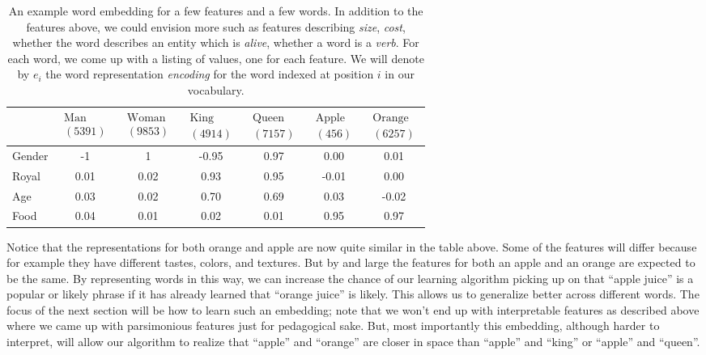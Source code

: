 \documentclass[12pt]{article}
\begin{document}
\begin{table}[h]
  \centering
  \begin{tabular}{l | c c c c c c }
    & $\substack{\textrm{Man} \\ (5391)}$ & $\substack{\textrm{Woman} \\ (9853)}$ & $\substack{\textrm{King} \\ (4914)}$ & $\substack{\textrm{Queen} \\ (7157)}$ & $\substack{\textrm{Apple} \\ (456)}$ & $\substack{\textrm{Orange} \\ (6257)}$ \\
\hline
Gender & -1 & 1 & -0.95 & 0.97 & 0.00 & 0.01 \\
Royal  & 0.01 & 0.02 & 0.93 & 0.95 & -0.01 & 0.00 \\
Age    & 0.03 & 0.02 & 0.70 & 0.69 & 0.03  & -0.02 \\
Food   & 0.04 & 0.01 & 0.02 & 0.01 & 0.95  & 0.97
  \end{tabular}
  \label{tb: wordembeddingtable}
\caption{\footnotesize An example word embedding for a few features and a few words. In addition to the features above, we could envision more such as features describing \emph{size}, \emph{cost}, whether the word describes an entity which is \emph{alive}, whether a word is a \emph{verb}. For each word, we come up with a listing of values, one for each feature. We will denote by $e_i$ the word representation \emph{encoding} for the word indexed at position $i$ in our vocabulary.}
\end{table}
Notice that the representations for both orange and apple are now quite similar in the table above. Some of the features will differ because for example they have different tastes, colors, and textures. But by and large the features for both an apple and an orange are expected to be the same. By representing words in this way, we can increase the chance of our learning algorithm picking up on that ``apple juice'' is a popular or likely phrase if it has already learned that ``orange juice'' is likely. This allows us to generalize better across different words. The focus of the next section will be how to learn such an embedding; note that we won't end up with interpretable features as described above where we came up with parsimonious features just for pedagogical sake. But, most importantly this embedding, although harder to interpret, will allow
our algorithm to realize that ``apple'' and ``orange'' are closer in space than ``apple'' and ``king'' or ``apple'' and ``queen''.
\end{document}
